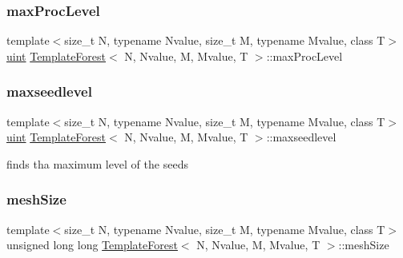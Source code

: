 \mbox{\label{classTemplateForest_ae3282ab0b3800e3f4c8b1fcfb9a6246e}} 
\subsubsection{\texorpdfstring{max\+Proc\+Level}{maxProcLevel}}
{\footnotesize\ttfamily template$<$size\+\_\+t N, typename Nvalue, size\+\_\+t M, typename Mvalue, class T$>$ \\
\mbox{\hyperlink{definitions_8h_a69aa29b598b851b0640aa225a9e5d61d}{uint}} \mbox{\hyperlink{classTemplateForest}{Template\+Forest}}$<$ N, Nvalue, M, Mvalue, T $>$\+::max\+Proc\+Level\hspace{0.3cm}{\ttfamily [private]}}

\mbox{\label{classTemplateForest_acde2c3f1395094ba171138b58b6eb335}} 
\subsubsection{\texorpdfstring{maxseedlevel}{maxseedlevel}}
{\footnotesize\ttfamily template$<$size\+\_\+t N, typename Nvalue, size\+\_\+t M, typename Mvalue, class T$>$ \\
\mbox{\hyperlink{definitions_8h_a69aa29b598b851b0640aa225a9e5d61d}{uint}} \mbox{\hyperlink{classTemplateForest}{Template\+Forest}}$<$ N, Nvalue, M, Mvalue, T $>$\+::maxseedlevel\hspace{0.3cm}{\ttfamily [private]}}

finds tha maximum level of the seeds \mbox{\label{classTemplateForest_a421f9554610485547148a476d2e67147}} 
\subsubsection{\texorpdfstring{mesh\+Size}{meshSize}}
{\footnotesize\ttfamily template$<$size\+\_\+t N, typename Nvalue, size\+\_\+t M, typename Mvalue, class T$>$ \\
unsigned long long \mbox{\hyperlink{classTemplateForest}{Template\+Forest}}$<$ N, Nvalue, M, Mvalue, T $>$\+::mesh\+Size\hspace{0.3cm}{\ttfamily [private]}}

